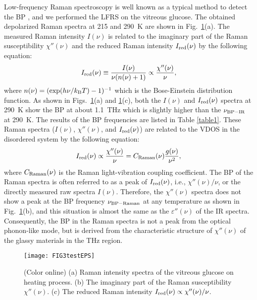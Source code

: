 \documentclass[%
 reprint,
superscriptaddress,
 amsmath,amssymb,
 aps,
prb,
]{revtex4-1}
\begin{document}
Low-frequency Raman spectroscopy is well known as a typical method to detect the BP \cite{Kojima1993, Surovtsev2002}, and we performed the LFRS on the vitreous glucose.
The obtained depolarized Raman spectra at 215 and 290~K are shown in Fig.~\ref{fig3}(a).
The measured Raman intensity $I(\nu)$ is related to the imaginary part of the Raman susceptibility $\chi''(\nu)$ and the reduced Raman intensity $I_{\rm red}(\nu)$ by the following equation: \cite{Hayes1978, Yannopoulos2006}
\begin{equation}
I_{\rm red}(\nu) \equiv \frac{I(\nu)}{\nu(n(\nu)+1)} \propto \frac{\chi''(\nu)}{\nu},
\label{eq-Ired}
\end{equation}
where $n(\nu) = ({\rm exp}(h\nu/k_{\rm B}T)-1)^{-1}$ which is the Bose-Einstein distribution function.
As shown in Figs.~\ref{fig3}(a) and \ref{fig3}(c), both the $I(\nu)$ and $I_{\rm red}(\nu)$ spectra at 290~K show the BP at about 1.1~THz which is slightly higher than the $\nu_{\rm BP-IR}$ at 290~K.
The results of the BP frequencies are listed in Table \ref{table1}.
These Raman spectra ($I(\nu)$, $\chi''(\nu)$, and $I_{\rm red}(\nu)$) are related to the VDOS in the disordered system by the following equation: \cite{Shuker1970, Galeener1978, Schirmacher2015, footnote1}
\begin{equation}
I_{\rm red}(\nu) \propto \frac{\chi''(\nu)}{\nu} = C_{\rm Raman}(\nu)\frac{g(\nu)}{\nu^{2}},
\label{eq-CRaman}
\end{equation}
where $C_{\rm Raman}(\nu)$ is the Raman light-vibration coupling coefficient.
The BP of the Raman spectra is often referred to as a peak of $I_{\rm red}(\nu)$, i.e., $\chi''(\nu)/\nu$, or the directly measured raw spectra $I(\nu)$.
Therefore, the $\chi''(\nu)$ spectra does not show a peak at the BP frequency $\nu_{\rm BP-Raman}$ at any temperature as shown in Fig.~\ref{fig3}(b), and this situation is almost the same as the $\varepsilon''(\nu)$ of the IR spectra.
Consequently, the BP in the Raman spectra is not a peak from the optical phonon-like mode, but is derived from the characteristic structure of $\chi''(\nu)$ of the glassy materials in the THz region.

\begin{figure}
\texttt{[image: FIG3testEPS]}
\caption{(Color online) (a) Raman intensity spectra of the vitreous glucose on heating process. (b) The imaginary part of the Raman susceptibility $\chi''(\nu)$.  (c) The reduced Raman intensity $I_{\rm red}(\nu) \propto \chi''(\nu)/\nu$.}
\label{fig3}
\end{figure}
\end{document}
